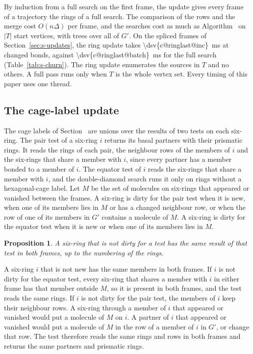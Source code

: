 \documentclass[preprint,12pt]{elsarticle}
\newtheorem{proposition}{Proposition}
\begin{document}
By induction from a full search on the first frame, the update gives every frame of a trajectory the rings of a full search.
The comparison of the rows and the merge cost $O(n\Delta)$ per frame, and the searches cost as much as Algorithm~ on $|T|$ start vertices, with trees over all of $G'$.
On the spliced frames of Section~\ref{sec:s-updates}, the ring update takes \qty{\dsv{c@ringlast@inc}}{\milli\second} at  changed bonds, against \qty{\dsv{c@ringlast@batch}}{\milli\second} for the full search (Table~\ref{tab:s-churn}).
The ring update enumerates the sources in $T$ and no others.
A full pass runs only when $T$ is the whole vertex set.
Every timing of this paper uses one thread.

\subsection{The cage-label update}
\label{sec:s-dirty}

The cage labels of Section~ are unions over the results of two tests on each six-ring.
The pair test of a six-ring $i$ returns its basal partners with their prismatic rings.
It reads the rings of each pair, the neighbour rows of the members of $i$ and the six-rings that share a member with $i$, since every partner has a member bonded to a member of $i$.
The equator test of $i$ reads the six-rings that share a member with $i$, and the double-diamond search runs it only on rings without a hexagonal-cage label.
Let $M$ be the set of molecules on six-rings that appeared or vanished between the frames.
A six-ring is dirty for the pair test when it is new, when one of its members lies in $M$ or has a changed neighbour row, or when the row of one of its members in $G'$ contains a molecule of $M$.
A six-ring is dirty for the equator test when it is new or when one of its members lies in $M$.

\begin{proposition}
\label{prop:s-dirty} A six-ring that is not dirty for a test has the same result of that test in both frames, up to the numbering of the rings.
\end{proposition}

\begin{pf}
A six-ring $i$ that is not new has the same members in both frames.
If $i$ is not dirty for the equator test, every six-ring that shares a member with $i$ in either frame has that member outside $M$, so it is present in both frames, and the test reads the same rings.
If $i$ is not dirty for the pair test, the members of $i$ keep their neighbour rows.
A six-ring through a member of $i$ that appeared or vanished would put a molecule of $M$ on $i$.
A partner of $i$ that appeared or vanished would put a molecule of $M$ in the row of a member of $i$ in $G'$, or change that row.
The test therefore reads the same rings and rows in both frames and returns the same partners and prismatic rings.
\end{pf}
\end{document}

